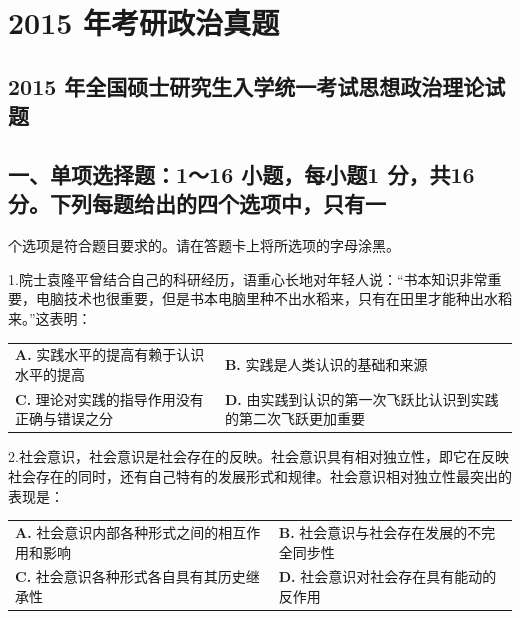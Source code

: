 \documentclass[UTF8,11pt]{ctexart}
\begin{document}
\section*{2015 年考研政治真题}
\subsection*{2015 年全国硕士研究生入学统一考试思想政治理论试题}

\subsection*{一、单项选择题：1～16 小题，每小题1 分，共16 分。下列每题给出的四个选项中，只有一}

个选项是符合题目要求的。请在答题卡上将所选项的字母涂黑。


1.院士袁隆平曾结合自己的科研经历，语重心长地对年轻人说：“书本知识非常重要，电脑技术也很重要，但是书本电脑里种不出水稻来，只有在田里才能种出水稻来。”这表明：


\begin{center}\begin{tabular}{>{\raggedright\arraybackslash}p{\dimexpr(\linewidth-4\tabcolsep)/2\relax}>{\raggedright\arraybackslash}p{\dimexpr(\linewidth-4\tabcolsep)/2\relax}}
\textbf{A.} 实践水平的提高有赖于认识水平的提高 & \textbf{B.} 实践是人类认识的基础和来源\\[.35em]
\textbf{C.} 理论对实践的指导作用没有正确与错误之分 & \textbf{D.} 由实践到认识的第一次飞跃比认识到实践的第二次飞跃更加重要\\[.35em]\end{tabular}\end{center}

2.社会意识，社会意识是社会存在的反映。社会意识具有相对独立性，即它在反映社会存在的同时，还有自己特有的发展形式和规律。社会意识相对独立性最突出的表现是：


\begin{center}\begin{tabular}{>{\raggedright\arraybackslash}p{\dimexpr(\linewidth-4\tabcolsep)/2\relax}>{\raggedright\arraybackslash}p{\dimexpr(\linewidth-4\tabcolsep)/2\relax}}
\textbf{A.} 社会意识内部各种形式之间的相互作用和影响 & \textbf{B.} 社会意识与社会存在发展的不完全同步性\\[.35em]
\textbf{C.} 社会意识各种形式各自具有其历史继承性 & \textbf{D.} 社会意识对社会存在具有能动的反作用\\[.35em]\end{tabular}\end{center}
\end{document}
